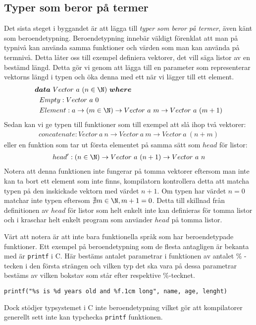 \subsection{Typer som beror på termer}
Det sista steget i byggandet är att lägga till \emph{typer som beror på
termer}, även känt som beroendetypning. Beroendetypning innebär väldigt
förenklat att man på typnivå kan använda samma funktioner och värden som man
kan använda på termnivå. Detta låter oss till exempel definiera vektorer, det
vill säga listor av en bestämd längd. Detta gör vi genom att lägga till en
parameter som representerar vektorns längd i typen och öka denna med ett när vi
lägger till ett element.
\begin{align*}
  &\boldsymbol{data}\ Vector\ a\ (n \in \N)\ \boldsymbol{where} \\
  &\ \ Empty : Vector\ a\ 0 \\
  &\ \ Element : a \to (m \in \N) \to Vector\ a\ m \to Vector\ a\ (m+1)
\end{align*}
Sedan kan vi ge typen till funktioner som till exempel att slå ihop två
vektorer:
\begin{align*}
  concatenate : Vector\ a\ n \to Vector\ a\ m \to Vector\ a\ (n+m)
\end{align*}
eller en funktion som tar ut första elementet på samma sätt som $head$ för
listor:
\begin{align*}
  head' : (n \in \N) \to Vector\ a\ (n+1) \to Vector\ a\ n
\end{align*}
Notera att denna funktionen inte fungerar på tomma vektorer eftersom man inte
kan ta bort ett element som inte finns, kompilatorn kontrollera detta att
matcha typen på den inskickade vektorn med värdet $n+1$. Om typen har värdet
$n = 0$ matchar inte typen eftersom $\nexists m \in \N, m+1 = 0$. Detta till
skillnad från definitionen av $head$ för listor som helt enkelt inte kan
definieras för tomma listor och i \haskell{} kraschar helt enkelt program
som använder $head$ på tomma listor.

Värt att notera är att inte bara funktionella språk som har beroendetypade
funktioner. Ett exempel på beroendetypning som de flesta antagligen är bekanta
med är \texttt{printf} i \textsc{C}. Här bestäms antalet parametrar i funktionen
av antalet \% -tecken i den första strängen och vilken typ det ska vara på
dessa parametrar bestäms av vilken bokstav som står efter respektive
\%-tecknet.
\begin{verbatim}
printf("%s is %d years old and %f.1cm long", name, age, lenght)
\end{verbatim}
Dock stödjer typsystemet i \textsc{C} inte beroendetypning vilket gör att
kompilatorer generellt sett inte kan typchecka \texttt{printf} funktionen.

